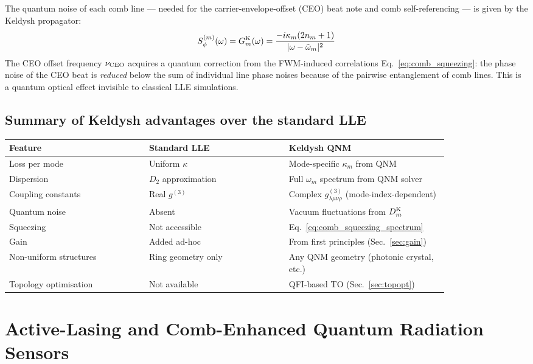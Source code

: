 \documentclass[12pt]{article}
\newcommand{\Keldysh}{{\rm K}}
\begin{document}
The quantum noise of each comb line — needed for the
carrier-envelope-offset (CEO) beat note and comb self-referencing
\cite{Reichert1999} — is given by the Keldysh propagator:
\begin{equation}
  S_\phi^{(m)}(\omega) = G^\Keldysh_m(\omega)
  = \frac{-i\kappa_m(2n_m+1)}{|\omega-\tilde{\omega}_m|^2}
  \label{eq:comb_phase_noise}
\end{equation}
The CEO offset frequency $\nu_{\rm CEO}$ acquires a quantum correction
from the FWM-induced correlations Eq.~\eqref{eq:comb_squeezing}:
the phase noise of the CEO beat is \emph{reduced} below the sum of
individual line phase noises because of the pairwise entanglement of
comb lines.  This is a quantum optical effect invisible to classical
LLE simulations.

\subsection{Summary of Keldysh advantages over the standard LLE}

\begin{center}
\begin{tabular}{p{0.28\linewidth}p{0.28\linewidth}p{0.28\linewidth}}
\toprule
Feature & Standard LLE & Keldysh QNM\\
\midrule
Loss per mode & Uniform $\kappa$ &
  Mode-specific $\kappa_m$ from QNM \\[3pt]
Dispersion & $D_2$ approximation &
  Full $\omega_m$ spectrum from QNM solver \\[3pt]
Coupling constants & Real $g^{(3)}$ &
  Complex $g^{(3)}_{\lambda\mu\nu\rho}$
  (mode-index-dependent) \\[3pt]
Quantum noise & Absent &
  Vacuum fluctuations from $D^\Keldysh_m$ \\[3pt]
Squeezing & Not accessible &
  Eq.~\eqref{eq:comb_squeezing_spectrum} \\[3pt]
Gain & Added ad-hoc &
  From first principles (Sec.~\ref{sec:gain}) \\[3pt]
Non-uniform structures & Ring geometry only &
  Any QNM geometry (photonic crystal, etc.) \\[3pt]
Topology optimisation & Not available &
  QFI-based TO (Sec.~\ref{sec:topopt}) \\
\bottomrule
\end{tabular}
\end{center}


\section{Active-Lasing and Comb-Enhanced Quantum Radiation Sensors}
\label{sec:active_sensor}
\end{document}
